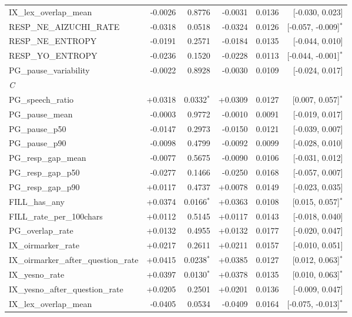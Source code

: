 \begin{longtable}{lrrrrr}
\quad IX\_lex\_overlap\_mean & -0.0026 & 0.8776 & -0.0031 & 0.0136 & [-0.030, 0.023] \\
\quad RESP\_NE\_AIZUCHI\_RATE & -0.0318 & 0.0518 & -0.0324 & 0.0126 & [-0.057, -0.009]$^{*}$ \\
\quad RESP\_NE\_ENTROPY & -0.0191 & 0.2571 & -0.0184 & 0.0135 & [-0.044, 0.010] \\
\quad RESP\_YO\_ENTROPY & -0.0236 & 0.1520 & -0.0228 & 0.0113 & [-0.044, -0.001]$^{*}$ \\
\quad PG\_pause\_variability & -0.0022 & 0.8928 & -0.0030 & 0.0109 & [-0.024, 0.017] \\
\midrule
\multicolumn{6}{l}{\textit{C}} \\
\quad PG\_speech\_ratio & +0.0318 & 0.0332$^{*}$ & +0.0309 & 0.0127 & [0.007, 0.057]$^{*}$ \\
\quad PG\_pause\_mean & -0.0003 & 0.9772 & -0.0010 & 0.0091 & [-0.019, 0.017] \\
\quad PG\_pause\_p50 & -0.0147 & 0.2973 & -0.0150 & 0.0121 & [-0.039, 0.007] \\
\quad PG\_pause\_p90 & -0.0098 & 0.4799 & -0.0092 & 0.0099 & [-0.028, 0.010] \\
\quad PG\_resp\_gap\_mean & -0.0077 & 0.5675 & -0.0090 & 0.0106 & [-0.031, 0.012] \\
\quad PG\_resp\_gap\_p50 & -0.0277 & 0.1466 & -0.0250 & 0.0168 & [-0.057, 0.007] \\
\quad PG\_resp\_gap\_p90 & +0.0117 & 0.4737 & +0.0078 & 0.0149 & [-0.023, 0.035] \\
\quad FILL\_has\_any & +0.0374 & 0.0166$^{*}$ & +0.0363 & 0.0108 & [0.015, 0.057]$^{*}$ \\
\quad FILL\_rate\_per\_100chars & +0.0112 & 0.5145 & +0.0117 & 0.0143 & [-0.018, 0.040] \\
\quad PG\_overlap\_rate & +0.0132 & 0.4955 & +0.0132 & 0.0177 & [-0.020, 0.047] \\
\quad IX\_oirmarker\_rate & +0.0217 & 0.2611 & +0.0211 & 0.0157 & [-0.010, 0.051] \\
\quad IX\_oirmarker\_after\_question\_rate & +0.0415 & 0.0238$^{*}$ & +0.0385 & 0.0127 & [0.012, 0.063]$^{*}$ \\
\quad IX\_yesno\_rate & +0.0397 & 0.0130$^{*}$ & +0.0378 & 0.0135 & [0.010, 0.063]$^{*}$ \\
\quad IX\_yesno\_after\_question\_rate & +0.0205 & 0.2501 & +0.0201 & 0.0136 & [-0.009, 0.047] \\
\quad IX\_lex\_overlap\_mean & -0.0405 & 0.0534 & -0.0409 & 0.0164 & [-0.075, -0.013]$^{*}$ \\

\end{longtable}
